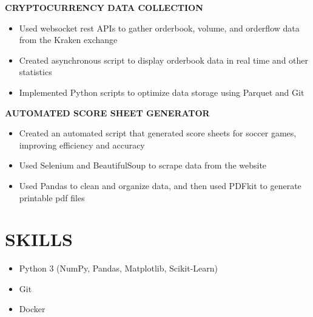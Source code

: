 \documentclass[11pt,letterpaper]{article}
\newcommand{\role}[4]{
  \begin{center}
  \textbf{#1} \hfill \textbf{#2} \\
  \textit{#3} \hfill \textit{#4}
  \end{center}
}
\begin{document}
\begin{flushleft}
  \textbf{CRYPTOCURRENCY DATA COLLECTION}
  \begin{itemize}[leftmargin=*,nosep]
    \item Used websocket rest APIs to gather orderbook, volume, and orderflow data from the Kraken exchange
    \item Created asynchronous script to display orderbook data in real time and other statistics
    \item Implemented Python scripts to optimize data storage using Parquet and Git
  \end{itemize}
\end{flushleft}

\begin{flushleft}
  \textbf{AUTOMATED SCORE SHEET GENERATOR}
  \begin{itemize}[leftmargin=*,nosep]
    \item Created an automated script that generated score sheets for soccer games, improving efficiency and accuracy
    \item Used Selenium and BeautifulSoup to scrape data from the website
    \item Used Pandas to clean and organize data, and then used PDFkit to generate printable pdf files 
  \end{itemize}
\end{flushleft}



\vspace{1em}
\section{SKILLS}

\vspace{0.5em}
\begin{itemize}[leftmargin=*,nosep]
  \item Python 3 (NumPy, Pandas, Matplotlib, Scikit-Learn)
  \item Git
  \item Docker 
\end{itemize}
\end{document}

